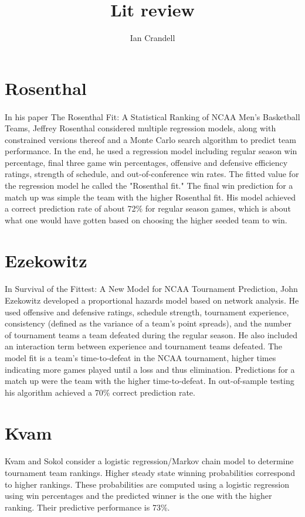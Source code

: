 \documentclass{article}
\title{Lit review}
\author{Ian Crandell}
\begin{document}
\maketitle

\section{Rosenthal}

\paragraph{} In his paper The Rosenthal Fit: A Statistical Ranking of NCAA Men’s Basketball Teams, Jeffrey Rosenthal considered multiple regression models, along with constrained versions thereof and a Monte Carlo search algorithm to predict team performance. In the end, he used a regression model including regular season win percentage, final three game win percentages, offensive and defensive efficiency ratings, strength of schedule, and out-of-conference win rates. The fitted value for the regression model he called the "Rosenthal fit." The final win prediction for a match up was simple the team with the higher Rosenthal fit. His model achieved a correct prediction rate of about 72\% for regular season games, which is about what one would have gotten based on choosing the higher seeded team to win.

\section{Ezekowitz}

\paragraph{} In Survival of the Fittest: A New Model for NCAA Tournament Prediction, John Ezekowitz developed a proportional hazards model based on network analysis. He used offensive and defensive ratings, schedule strength, tournament experience, consistency (defined as the variance of a team's point spreads), and the number of tournament teams a team defeated during the regular season. He also included an interaction term between experience and tournament teams defeated. The model fit is a team's time-to-defeat in the NCAA tournament, higher times indicating more games played until a loss and thus elimination. Predictions for a match up were the team with the higher time-to-defeat. In out-of-sample testing his algorithm achieved a 70\% correct prediction rate.

\section{Kvam}

\paragraph{} Kvam and Sokol consider a logistic regression/Markov chain model to determine tournament team rankings. Higher steady state winning probabilities correspond to higher rankings. These probabilities are computed using a logistic regression using win percentages and the predicted winner is the one with the higher ranking. Their predictive performance is 73\%.
\end{document}
